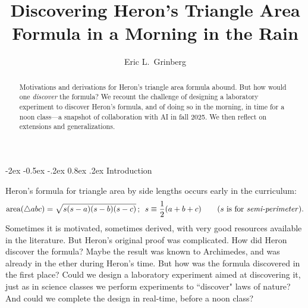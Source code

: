 \documentclass[10.5pt]
{amsart}
\makeatletter
\renewcommand{\section}{\@startsection{section}{1}{\z@}%
  {-2ex \@plus -0.5ex \@minus -.2ex}%
  {0.8ex \@plus .2ex}%
  {\normalfont\Large\bfseries}}
\makeatother
\begin{document}
\title
{\small Discovering Heron's Triangle Area Formula in a Morning in the Rain
}

\author{Eric L.~Grinberg}
\date{} %

\newenvironment{acknowledgement}%
    {\large\bfseries Acknowledgement%
    \par\medskip\normalfont\normalsize}%
    {}%


\begin{abstract}
Motivations and derivations for Heron's triangle area formula abound. But how would one \emph{discover} the formula? We recount the challenge of designing a laboratory experiment to discover Heron's formula, and of doing so in the morning, in time for a noon class---a snapshot of collaboration with AI in fall 2025. We then reflect on extensions and generalizations.
\end{abstract}

\maketitle




\vspace{-20pt}
\section{Introduction}

Heron's formula for triangle area by side lengths occurs early in the curriculum: 
\[ \operatorname{area}(\triangle abc)= \sqrt{s(s-a)(s-b)(s-c)}\, ; \,\,\, s \equiv \frac{1}{2}(a+b+c)
\text{\qquad  ($s$ is for \emph{semi-perimeter})}
.
\] 
Sometimes it is motivated, sometimes derived, with very good resources available in the literature. But Heron's original proof was complicated. How did Heron discover the formula? Maybe the result was known to Archimedes, and was already in the ether during Heron's time. But how was the formula discovered in the first place? Could we design a laboratory experiment aimed at discovering it, just as in science classes we perform experiments to ``discover" laws of nature? And could we complete the design in real-time, before a noon class?
\end{document}
